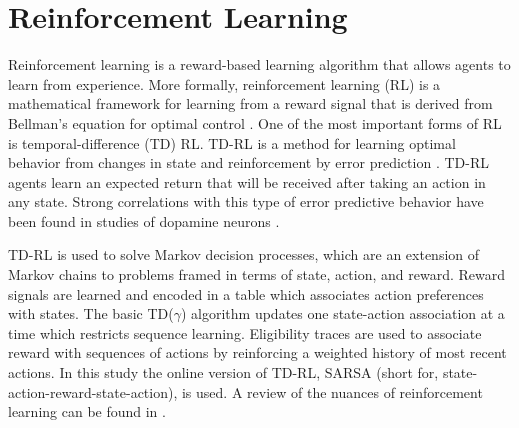 \section{Reinforcement Learning}
\label{sec:RL}
Reinforcement learning is a reward-based learning algorithm that allows agents
to learn from experience. More formally, reinforcement
learning (RL) is a mathematical framework for learning from a reward signal that
is derived from Bellman's equation for optimal control \cite{sutton1998introduction}. One of
the most important forms of RL is temporal-difference (TD) RL. TD-RL is a method
for learning optimal behavior from changes in state and reinforcement by error
prediction \cite{sutton1988learning}. TD-RL agents learn an expected return that will be
received after taking an action in any state. Strong correlations with this type of
error predictive behavior have been found in studies of dopamine neurons
\cite{schultz1993responses}. 

TD-RL is used to solve Markov decision processes, which are an extension of
Markov chains to problems framed in terms of state, action, and reward. Reward signals are learned and encoded
in a table which associates action preferences with states. The basic
TD($\gamma$) algorithm updates one state-action association at a time which
restricts sequence learning. Eligibility traces are used to associate reward
with sequences of actions by reinforcing a weighted history of most recent
actions. In this study the online version of TD-RL, SARSA (short for,
state-action-reward-state-action), is used. A review of the nuances of
reinforcement learning can be found in \cite{sutton1998introduction}.


